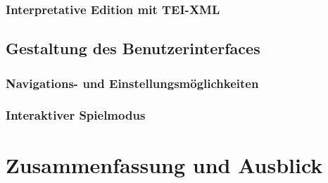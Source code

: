 \documentclass[12pt,a4paper]{article}
\begin{document}
		\subsubsection{Interpretative Edition mit TEI-XML}
	\subsection{Gestaltung des Benutzerinterfaces}
		\subsubsection{Navigations- und Einstellungsmöglichkeiten}
		\subsubsection{Interaktiver Spielmodus}

\section{Zusammenfassung und Ausblick}


\printbibliography
\end{document}
